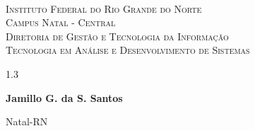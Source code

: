 
\begin{titlepage}
	\begin{center}
		
		  
		\begin{minipage}{11.15cm}
			\begin{center}
				\begin{espacosimples}
					{\small \ \\
                       \textsc{Instituto Federal do Rio Grande do Norte}
                       \\
							  \textsc{Campus Natal - Central}					\\
							  \textsc{Diretoria de Gestão e Tecnologia da Informação}	   
							  \\
							  \textsc{Tecnologia em Análise e Desenvolvimento de Sistemas}}   	
                       \\
				\end{espacosimples}
			\end{center}
		\end{minipage}

			
		\vspace{6cm}
						
		{\setlength{\baselineskip}%
		{1.3\baselineskip}
		{\LARGE \textbf{\writedocumenttitle}}\par}
			
		\vspace{3cm}
			
		{\large \textbf{Jamillo G. da S. Santos}}
						
		\vspace{6cm}
		
		Natal-RN\\\writedate
	\end{center}
\end{titlepage}